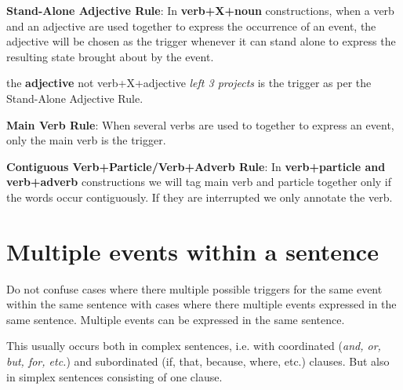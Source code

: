 \documentclass[a4paper]{report}
\begin{document}
\noindent\textbf{Stand-Alone Adjective Rule}:
In \textbf{verb+X+noun} constructions, when a verb and an adjective are used together to express the occurrence of an event, the adjective will be chosen as the trigger whenever it can stand alone to express the resulting state brought about by the event.

\begin{exe}
    \ex {}
        \expl the \textbf{adjective}  not verb+X+adjective \textit{left 3 projects} is the trigger as per the Stand-Alone Adjective Rule.
\end{exe}

\noindent\textbf{Main Verb Rule}: When several verbs are used to together to express an event, only the main verb is the trigger.
\begin{exe}
    \ex {}
    \ex {}
    \ex {}
    \ex {}
\end{exe}

\noindent\textbf{Contiguous Verb+Particle/Verb+Adverb Rule}: In \textbf{verb+particle and verb+adverb} constructions we will tag main verb and particle together only if the words occur contiguously. If they are interrupted we only annotate the verb.
\begin{exe}
    \ex {}
    \ex {}
    \ex {}
    \ex {}
\end{exe}

\section{Multiple events within a sentence}
Do not confuse cases where there multiple possible triggers for the same event within the same sentence with cases where there multiple events expressed in the same sentence.
Multiple events can be expressed in the same sentence.

This usually occurs both in complex sentences, i.e. with coordinated (\textit{and, or, but, for, etc.}) and subordinated (if, that, because, where, etc.) clauses.
But also in simplex sentences consisting of one clause.
\end{document}
